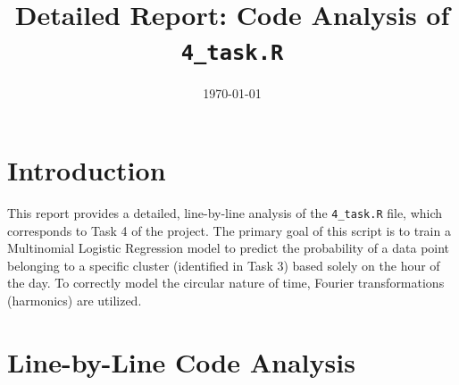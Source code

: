 \documentclass{article}
\title{Detailed Report: Code Analysis of \texttt{4\_task.R}}
\author{}
\date{\today}
\begin{document}
\maketitle

\section{Introduction}
This report provides a detailed, line-by-line analysis of the \texttt{4\_task.R} file, which corresponds to Task 4 of the project. The primary goal of this script is to train a Multinomial Logistic Regression model to predict the probability of a data point belonging to a specific cluster (identified in Task 3) based solely on the hour of the day. To correctly model the circular nature of time, Fourier transformations (harmonics) are utilized.

\section{Line-by-Line Code Analysis}
\end{document}
